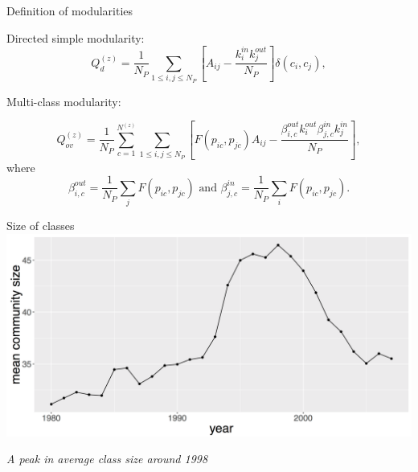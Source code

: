 \documentclass{beamer}
\begin{document}
\begin{frame}{Definition of modularities} \label{slide:modularity_def}
\hyperlink{slide:modularity}{}

    Directed simple modularity:
    \[
Q_d^{(z)} = \displaystyle \frac{1}{N_P}\sum_{1\leq i,j\leq N_P}\left[A_{ij} - \frac{k_{i}^{in}k_{j}^{out}}{N_P}\right]\delta(c_i,c_j),
\]


\bigskip

Multi-class modularity:

\[
\displaystyle Q_{ov}^{(z)} = \frac{1}{N_P} \sum_{c = 1}^{N^{(z)}} \sum_{1\leq i,j \leq N_P}\left[F(p_{ic},p_{jc})A_{ij} - \frac{\beta_{i,c}^{out}k_i^{out}\beta_{j,c}^{in}k_j^{in}}{N_P}\right],
\]
where
\[
 \beta_{i,c}^{out} =   \frac{1}{N_P} \displaystyle \sum_j F(p_{ic},p_{jc}) \text{ and } \beta_{j,c}^{in} =  \frac{1}{N_P} \displaystyle \sum_i F(p_{ic},p_{jc}).
\]
    
\end{frame}



\begin{frame}{Size of classes}
   \centering
    \includegraphics[width=\textwidth]{figures/Fig3.png}
    
    \medskip
    
    \textit{A peak in average class size around 1998}
    
\end{frame}
\end{document}

